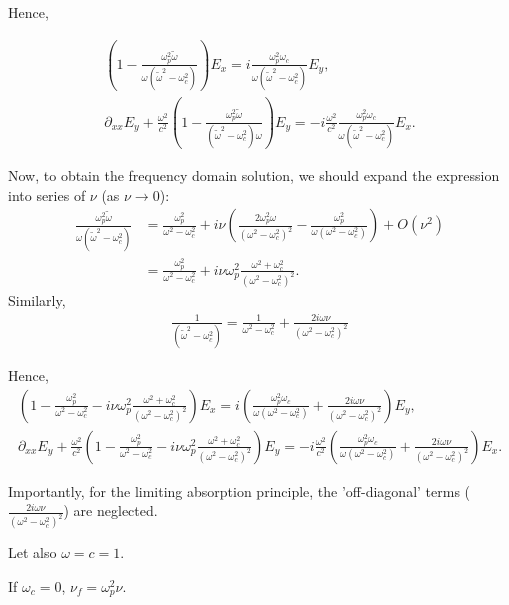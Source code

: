\documentclass[a4paper,10pt]{article}
\begin{document}
Hence,

\begin{align*}
\left(1-\frac{\omega_p^2\tilde{\omega}}{\omega(\tilde{\omega}^2-\omega_c^2)}\right)E_x=i\frac{\omega_p^2\omega_c}{\omega(\tilde{\omega}^2-\omega_c^2)}E_y,\\
\partial_{xx} E_y+\frac{\omega^2}{c^2}\left(1-\frac{\omega_p^2\tilde{\omega}}{(\tilde{\omega}^2-\omega_c^2)\omega}\right)E_y=
-i\frac{\omega^2}{c^2}\frac{\omega_p^2 \omega_c}{\omega(\tilde{\omega}^2-\omega^2_c)}E_x.
\end{align*}

Now, to obtain the frequency domain solution, we should expand the expression into series of $\nu$ (as $\nu\rightarrow 0$):
\begin{align*}
 \frac{\omega_p^2\tilde{\omega}}{\omega(\tilde{\omega}^2-\omega_c^2)}&=
 \frac{\omega_p^2}{\omega^2-\omega_c^2}+i\nu\left(
 \frac{2\omega_p^2\omega}{(\omega^2-\omega^2_c)^2}-
 \frac{\omega_p^2}{\omega(\omega^2-\omega_c^2)}\right)+O(\nu^2)\\
 &=\frac{\omega_p^2}{\omega^2-\omega_c^2}+i\nu\omega_p^2\frac{\omega^2+\omega_c^2}{(\omega^2-\omega_c^2)^2}.
\end{align*}
Similarly,
\begin{align*}
 \frac{1}{(\tilde{\omega}^2-\omega^2_c)}=\frac{1}{\omega^2-\omega_c^2}+\frac{2i\omega\nu}{(\omega^2-\omega^2_c)^2}
\end{align*}

Hence,
\begin{align*}
\left(1-\frac{\omega_p^2}{\omega^2-\omega_c^2}-i\nu\omega_p^2\frac{\omega^2+\omega_c^2}{(\omega^2-\omega_c^2)^2}\right)E_x=
i\left(\frac{\omega_p^2\omega_c}{\omega(\omega^2-\omega_c^2)}+\frac{2i\omega\nu}{(\omega^2-\omega^2_c)^2}\right)E_y,\\
\partial_{xx} E_y+\frac{\omega^2}{c^2}
\left(1-\frac{\omega_p^2}{\omega^2-\omega_c^2}-i\nu\omega_p^2\frac{\omega^2+\omega_c^2}{(\omega^2-\omega_c^2)^2}\right)E_y=
-i\frac{\omega^2}{c^2}\left(\frac{\omega_p^2\omega_c}{\omega(\omega^2-\omega_c^2)}+\frac{2i\omega\nu}{(\omega^2-\omega^2_c)^2}\right)E_x.
\end{align*}

Importantly, for the limiting absorption principle, the 'off-diagonal' terms ($\frac{2i\omega\nu}{(\omega^2-\omega^2_c)^2}$) are neglected.

Let also $\omega=c=1$. 

If $\omega_c=0$, $\nu_f=\omega_p^2\nu$.
\end{document}
